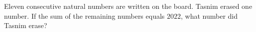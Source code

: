 Eleven consecutive natural numbers are written on the board. Tasnim erased one number. If the sum of the remaining numbers equals $2022$, what number did Tasnim erase?
